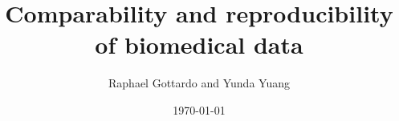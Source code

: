 \documentclass[11pt]{article}\usepackage{graphicx, color}
\begin{document}
\title{Comparability and reproducibility of biomedical data}

\author{Raphael Gottardo and Yunda Yuang}

\date{\today}
\maketitle



% 
\end{document}
